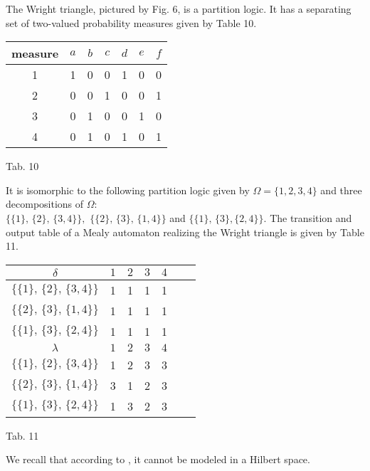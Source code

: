 \begin{example}\label{ex7.2} The Wright triangle, pictured by
Fig. 6, is a partition logic. It has a separating set of
two-valued probability measures given by Table 10.

\vspace{1cm}
{\rm
\begin{center}
\begin{tabular}{|c|c|c|c|c|c|c|}\hline%
measure & $a$ & $b$ & $c$ & $d$ & $e$ & $f$  \\ \hline
1     &  1  &  0  &  0  &  1  &  0  &  0 \\
2     &  0  &  0  &  1  &  0  &  0  &  1 \\
3     &  0  &  1  &  0  &  0  &  1  &  0 \\
4     &  0  &  1  &  0  &  1  &  0  &  1 \\
\hline
\end{tabular}

\begin{center} Tab. 10  \end{center}
\end{center}
}
 It is isomorphic to the following
partition logic given by $\Omega =\{1,2,3,4\}$ and three
decompositions of $\Omega$:
\\ %
 $\{\{1\},\, \{2\},\,\{3,4\}\},$
$\{\{2\},\, \{3\},\, \{
1
,4\}\}$ and $\{\{1\},\, \{3\}, \{2,4\}\}.$
The transition and output table of a Mealy automaton realizing the
Wright triangle is given by Table 11.

\vspace{1cm}
{\rm
\begin{center}
\begin{tabular}{|c|c|c|c|c|c|c|}\hline%
$\delta$ & $1$ & $2$ & $3$ & $4$ \\ \hline
 $\{\{1\},\, \{2\},\,\{3,4\}\}$ &1&1&1&1\\
 $\{\{2\},\, \{3\},\,\{1,4\}\}$ &1&1&1&1\\
 $\{\{1\},\, \{3\},\,\{2,4\}\}$ &1&1&1&1\\
\hline
\hline
$\lambda$ & $1$ & $2$ & $3$ & $4$ \\ \hline
 $\{\{1\},\, \{2\},\,\{3,4\}\}$ &1&2&3&3\\
 $\{\{2\},\, \{3\},\,\{1,4\}\}$ &3&1&2&3\\
 $\{\{1\},\, \{3\},\,\{2,4\}\}$ &1&3&2&3\\
\hline
\end{tabular}

\begin{center} Tab. 11  \end{center}
\end{center}
}
We recall that according to {\rm \cite{Wri}}, it cannot be modeled in a
Hilbert space.
\end{example}

